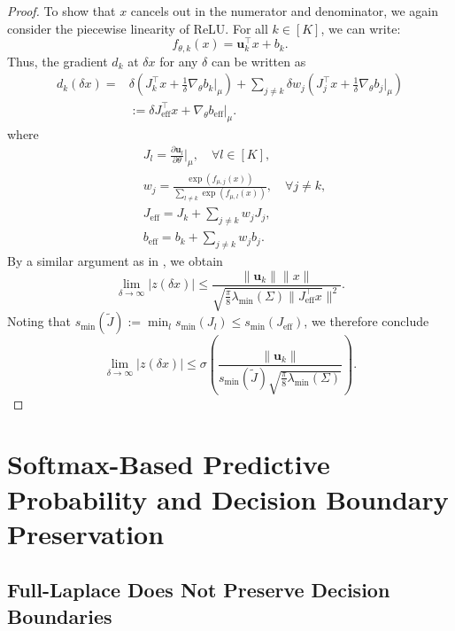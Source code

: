 \documentclass{article}
\begin{document}
\begin{proof}
To show that \( x \) cancels out in the numerator and denominator, we again consider the piecewise linearity of ReLU. For all \( k \in [K] \), we can write:
\begin{equation}
    f_{\theta,k}(x) = \mathbf{u}_{k}^{\intercal}x + b_{k}.
\end{equation}
Thus, the gradient \( d_k \) at \( \delta x \) for any \( \delta \) can be written as
\begin{align*}
    d_{k}(\delta x) =
    &\delta (J_{k}^{\intercal}x + \frac{1}{\delta}\nabla_{\theta} b_{k}|_{\mu}) 
    + \sum_{j\neq k}\delta w_{j}(J_{j}^{\intercal}x + \frac{1}{\delta}\nabla_{\theta}b_{j}|_{\mu})\\
    & := \delta J_{\text{eff}}^{\intercal}x + \nabla_{\theta} b_{\text{eff}}|_{\mu}.
\end{align*}
where
\begin{align*}
    & J_l = \frac{\partial \mathbf{u}_{l}}{\partial \theta}|_{\mu}, \quad \forall l \in [K],\\
    & w_j = \frac{\exp(f_{\mu,j}(x))}{\sum_{l\neq k}\exp(f_{\mu, l}(x))}, \quad \forall j \neq k, \\
    & J_{\text{eff}} = J_{k} + \sum_{j \neq k}w_j J_j, \\
    & b_{\text{eff}} = b_{k} + \sum_{j \neq k}w_j b_{j}.
\end{align*}
By a similar argument as in \cite{main_paper}, we obtain
\begin{equation*}
    \lim_{\delta\to \infty} \lvert z(\delta x)\rvert \leq \frac{\lVert\mathbf{u}_k\rVert \lVert x\rVert}
    {\sqrt{\frac{\pi}{8}\lambda_{\min}(\Sigma) \lVert J_{\text{eff}}^{\intercal}x}\rVert^{2}}.
\end{equation*}
Noting that \( s_{\min}(\tilde{J}) := \min_{l} s_{\min}(J_{l}) \leq s_{\min}(J_{\text{eff}}) \), we therefore conclude
\begin{equation*}
    \lim_{\delta\to \infty} \lvert z(\delta x)\rvert \leq 
    \sigma \left(\frac{\lVert\mathbf{u}_k\rVert}{s_{\min}(\tilde{J})\sqrt{\frac{\pi}{8}\lambda_{\min}(\Sigma)}}\right).
\end{equation*}
\end{proof}


\section{Softmax-Based Predictive Probability and Decision Boundary Preservation}

\subsection{Full-Laplace Does Not Preserve Decision Boundaries}
\end{document}
